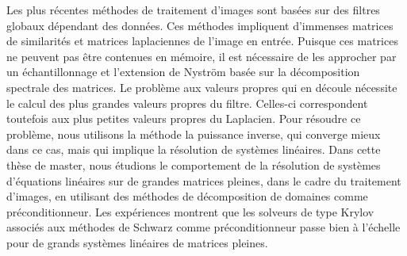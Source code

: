 Les plus récentes méthodes de traitement d'images sont basées sur des filtres globaux dépendant des données.
Ces méthodes impliquent d'immenses matrices de similarités et matrices laplaciennes de l'image en entrée.
Puisque ces matrices ne peuvent pas être contenues en mémoire, il est nécessaire de les approcher par un échantillonnage et l'extension de Nystr\"om basée sur la décomposition spectrale des matrices.
Le problème aux valeurs propres qui en découle nécessite le calcul des plus grandes valeurs propres du filtre.
Celles-ci correspondent toutefois aux plus petites valeurs propres du Laplacien.
Pour résoudre ce problème, nous utilisons la méthode la puissance inverse, qui converge mieux dans ce cas, mais qui implique la résolution de systèmes linéaires.
Dans cette thèse de master, nous étudions le comportement de la résolution de systèmes d'équations linéaires sur de grandes matrices pleines, dans le cadre du traitement d'images, en utilisant des méthodes de décomposition de domaines comme préconditionneur.
Les expériences montrent que les solveurs de type Krylov associés aux méthodes de Schwarz comme préconditionneur passe bien à l'échelle pour de grands systèmes linéaires de matrices pleines.
